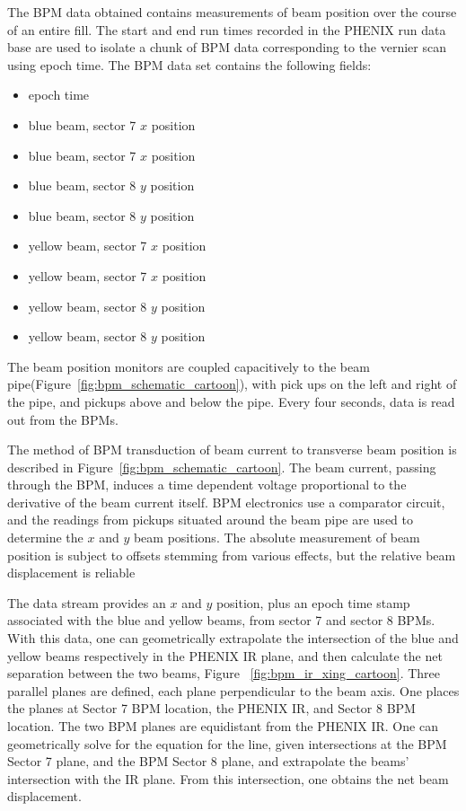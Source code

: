 The BPM data obtained contains measurements of beam position over the course of
an entire fill. The start and end run times recorded in the PHENIX run data
base are used to isolate a chunk of BPM data corresponding to the vernier scan
using epoch time. The BPM data set contains the following fields:
\begin{itemize}
\item epoch time
\item blue beam, sector 7 $x$ position
\item blue beam, sector 7 $x$ position
\item blue beam, sector 8 $y$ position
\item blue beam, sector 8 $y$ position
\item yellow beam, sector 7 $x$ position
\item yellow beam, sector 7 $x$ position
\item yellow beam, sector 8 $y$ position
\item yellow beam, sector 8 $y$ position
\end{itemize}

The beam position monitors are coupled capacitively to the beam
pipe(Figure~\ref{fig:bpm_schematic_cartoon}), with pick ups on the left and
right of the pipe, and pickups above and below the pipe. Every four seconds,
data is read out from the BPMs. 

The method of BPM transduction of beam current to transverse beam position is
described in Figure~\ref{fig:bpm_schematic_cartoon}. The beam current, passing
through the BPM,  induces a time dependent voltage proportional to the
derivative of the beam current itself. BPM electronics use a comparator circuit,
and the readings from pickups situated around the beam pipe are used to
determine the $x$ and $y$ beam positions. The absolute measurement of beam
position is subject to offsets stemming from various effects, but the relative
beam displacement is reliable~\cite{kawallfocus2005}


The data stream provides an $x$ and $y$ position, plus an epoch time stamp
associated with the blue and yellow beams, from sector 7 and sector 8 BPMs.
With this data, one can geometrically extrapolate the intersection of the blue
and yellow beams respectively in the PHENIX IR plane, and then calculate the
net separation between the two beams, Figure ~\ref{fig:bpm_ir_xing_cartoon}.
Three parallel planes are defined, each plane perpendicular to the beam axis.
One places the planes at Sector 7 BPM location, the PHENIX IR, and Sector 8 BPM
location.  The two BPM planes are equidistant from the PHENIX IR. One can
geometrically solve for the equation for the line, given intersections at the
BPM Sector 7 plane, and the BPM Sector 8 plane, and extrapolate the beams'
intersection with the IR plane. From this intersection, one obtains the net
beam displacement.


